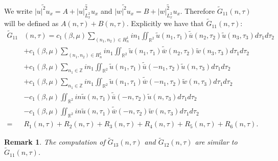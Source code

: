 \documentclass[reqno]{amsart}
\newtheorem{remark}[theorem]{Remark}
\numberwithin{equation}{section}
\begin{document}
We write
$\widetilde{|u|^2u_{x}}=A+\widetilde{|u|_{L_{x}^{2}}^{2}u_{x}}$
and
$\widetilde{|w|^2u_{x}}=B+\widetilde{|w|_{L_{x}^{2}}^{2}u_{x}}$.
Therefore  $\widetilde{G}_{11}(n,\tau)$ will be defined as
$A(n,\tau)+B(n,\tau)$. Explicitly we have that
$\widetilde{G}_{11}(n,\tau)$:
\begin{equation}
\begin{split}
\widetilde{G}_{11}&(n,\tau)  = c_{1}(\beta,\mu)\sum\limits_{(n_{1},n_{2})\in
H_{n}^{1}}in_{1}\iint\nolimits_{\mathbb{R}^{2}}\widetilde{u}(n_{1},\tau
_{1})\widetilde{\overline{u}}(n_{2},\tau_{2})\widetilde{u}(n_3,\tau_3)d\tau_{1}d\tau_{2}\\
& +c_{1}(\beta,\mu)\sum\limits_{(n_{1},n_{2})\in H_{n}^{1}}in_{1}\iint\nolimits_{\mathbb{R}^{2}}\widetilde{u}(n_{1},\tau_{1})\widetilde
{\overline{w}}(n_{2},\tau_{2})\widetilde{w}(n_3,\tau_3)d\tau_{1}d\tau_{2}\\
&  +c_{1}(\beta,\mu)\sum\limits_{n_{1}\in\mathbb{Z}}in_{1}\iint
\nolimits_{\mathbb{R}^{2}}\widetilde{u}(n_{1},\tau_{1})\widetilde{\overline
{u}}(-n_{1},\tau_{2})\widetilde{u}(n,\tau_3)d\tau_{1}d\tau
_{2}\\
&  +c_{1}(\beta,\mu)\sum\limits_{n_{1}\in\mathbb{Z}}in_{1}\iint
\nolimits_{\mathbb{R}^{2}}\widetilde{u}(n_{1},\tau_{1})\widetilde{\overline
{w}}(-n_{1},\tau_{2})\widetilde{w}(n,\tau_3)d\tau_{1}d\tau
_{2}\\
& -c_{1}(\beta,\mu)\iint\nolimits_{\mathbb{R}^{2}}in\widetilde{u}(n,\tau
_{1})\widetilde{\overline{u}}(-n,\tau_{2})\widetilde{u}(n,\tau_3)d\tau_{1}d\tau_{2}\\
& -c_{1}(\beta,\mu)\iint\nolimits_{\mathbb{R}^{2}}in\widetilde{u}(n,\tau_{1})
\widetilde{\overline{w}}(-n,\tau_{2})\widetilde{w}(n,\tau_3)d\tau_{1}d\tau_{2}\\
=& R_{1}(n,\tau)+R_{2}(n,\tau)+R_{3}(n,\tau)+R_{4}(n,\tau)+R_{5}(n,\tau)+R_{6}(n,\tau).
\end{split}
\end{equation}

\begin{remark}
The computation of $\widetilde{G}_{13}(n,\tau)$ and $\widetilde{G}_{12}(n,\tau)$ are
similar to $\widetilde{G}_{11}(n,\tau)$.
\end{remark}
\end{document}
